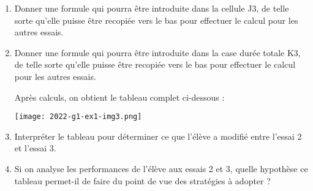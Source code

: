 \begin{enumerate}
\begin{enumerate}
        \item Donner une formule qui pourra être introduite dans la cellule J3, de telle sorte qu'elle puisse être recopiée vers le bas pour effectuer le calcul pour les autres essais.
        \item Donner une formule qui pourra être introduite dans la case \og{} durée totale \fg{} K3, de telle sorte qu'elle puisse être recopiée vers le bas pour effectuer le calcul pour les autres essais.

Après calculs, on obtient le tableau complet ci-dessous :

\begin{center}
  \texttt{[image: 2022-g1-ex1-img3.png]}	
\end{center}

		\item Interpréter le tableau pour déterminer ce que l'élève a modifié entre l'essai 2 et l'essai $3 .$
		\item Si on analyse les performances de l'élève aux essais 2 et 3, quelle hypothèse ce tableau permet-il de faire du point de vue des stratégies à adopter ?
		\end{enumerate}
		
\end{enumerate}
